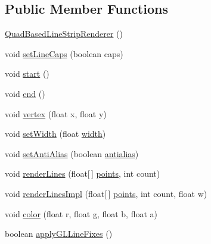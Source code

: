 \subsection*{Public Member Functions}
\begin{DoxyCompactItemize}
\item 
\mbox{\hyperlink{classorg_1_1newdawn_1_1slick_1_1opengl_1_1renderer_1_1_quad_based_line_strip_renderer_aaa72b9907ffda26fc5c047123457deb9}{Quad\+Based\+Line\+Strip\+Renderer}} ()
\item 
void \mbox{\hyperlink{classorg_1_1newdawn_1_1slick_1_1opengl_1_1renderer_1_1_quad_based_line_strip_renderer_a7b6834b1bd47220f6ebd45ee60672b30}{set\+Line\+Caps}} (boolean caps)
\item 
void \mbox{\hyperlink{classorg_1_1newdawn_1_1slick_1_1opengl_1_1renderer_1_1_quad_based_line_strip_renderer_a63893acff7cb6395fe2c941477a78e76}{start}} ()
\item 
void \mbox{\hyperlink{classorg_1_1newdawn_1_1slick_1_1opengl_1_1renderer_1_1_quad_based_line_strip_renderer_a1d55a722cf80e77c570f29ebe853d1ba}{end}} ()
\item 
void \mbox{\hyperlink{classorg_1_1newdawn_1_1slick_1_1opengl_1_1renderer_1_1_quad_based_line_strip_renderer_ae2ae9cf57163887ab122d24fa29f066f}{vertex}} (float x, float y)
\item 
void \mbox{\hyperlink{classorg_1_1newdawn_1_1slick_1_1opengl_1_1renderer_1_1_quad_based_line_strip_renderer_a1ebfc1a913b6cb8763137ba710354689}{set\+Width}} (float \mbox{\hyperlink{classorg_1_1newdawn_1_1slick_1_1opengl_1_1renderer_1_1_quad_based_line_strip_renderer_a2ea1970be2e402b69b69f7cefbf41c52}{width}})
\item 
void \mbox{\hyperlink{classorg_1_1newdawn_1_1slick_1_1opengl_1_1renderer_1_1_quad_based_line_strip_renderer_a5eb1002e1c8f2d044bc1d1e184bcbc62}{set\+Anti\+Alias}} (boolean \mbox{\hyperlink{classorg_1_1newdawn_1_1slick_1_1opengl_1_1renderer_1_1_quad_based_line_strip_renderer_a9da96cac3374734801a36209293b72fe}{antialias}})
\item 
void \mbox{\hyperlink{classorg_1_1newdawn_1_1slick_1_1opengl_1_1renderer_1_1_quad_based_line_strip_renderer_a58c67c21161f0f13d1b03b552bc6a664}{render\+Lines}} (float\mbox{[}$\,$\mbox{]} \mbox{\hyperlink{classorg_1_1newdawn_1_1slick_1_1opengl_1_1renderer_1_1_quad_based_line_strip_renderer_adeb4716a8ddb005cec7c3cc2ed9042e3}{points}}, int count)
\item 
void \mbox{\hyperlink{classorg_1_1newdawn_1_1slick_1_1opengl_1_1renderer_1_1_quad_based_line_strip_renderer_ac8ce59a50a6f3310717ed7c5ccf8c1ba}{render\+Lines\+Impl}} (float\mbox{[}$\,$\mbox{]} \mbox{\hyperlink{classorg_1_1newdawn_1_1slick_1_1opengl_1_1renderer_1_1_quad_based_line_strip_renderer_adeb4716a8ddb005cec7c3cc2ed9042e3}{points}}, int count, float w)
\item 
void \mbox{\hyperlink{classorg_1_1newdawn_1_1slick_1_1opengl_1_1renderer_1_1_quad_based_line_strip_renderer_ac85a3ec025db8b22c0bf046fb7dc92a8}{color}} (float r, float g, float b, float a)
\item 
boolean \mbox{\hyperlink{classorg_1_1newdawn_1_1slick_1_1opengl_1_1renderer_1_1_quad_based_line_strip_renderer_a535a64f5cf41e3373c44d6afbc3036f1}{apply\+G\+L\+Line\+Fixes}} ()
\end{DoxyCompactItemize}
